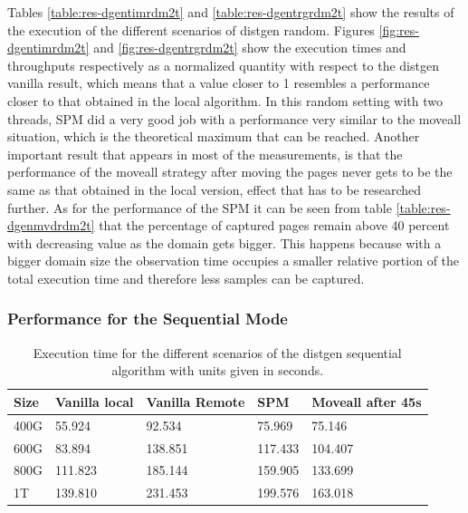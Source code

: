 Tables \ref{table:res-dgentimrdm2t} and \ref{table:res-dgentrgrdm2t} show the results of the execution of the different scenarios of distgen random. Figures \ref{fig:res-dgentimrdm2t} and \ref{fig:res-dgentrgrdm2t} show the execution times and throughputs respectively as a normalized quantity with respect to the distgen vanilla result, which means that a value closer to 1 resembles a performance closer to that obtained in the local algorithm. In this random setting with two threads, SPM did a very good job with a performance very similar to the moveall situation, which is the theoretical maximum that can be reached. Another important result that appears in most of the measurements, is that the performance of the moveall strategy after moving the pages never gets to be the same as that obtained in the local version, effect that has to be researched further.
As for the performance of the SPM it can be seen from table \ref{table:res-dgenmvdrdm2t} that the percentage of captured pages remain above 40 percent with decreasing value as the domain gets bigger. This happens because with a bigger domain size the observation time occupies a smaller relative portion of the total execution time and therefore less samples can be captured.

\FloatBarrier
\subsubsection{Performance for the Sequential Mode}\label{subsection:res-dgseq-2t}

\begin{table}[th]
	\centering
		\begin{tabularx}{\textwidth}{|l|l|l|l|X|}
		\hline
			Size & Vanilla local & Vanilla Remote & SPM & Moveall after 45s  \\
			\hline
			400G & 55.924 & 92.534  & 75.969 & 75.146\\
			\hline
			600G & 83.894 & 138.851 & 117.433 & 104.407 \\
			\hline
			800G & 111.823 & 185.144 & 159.905 & 133.699 \\
			\hline
			1T & 139.810 & 231.453 & 199.576 & 163.018 \\
			\hline
		\end{tabularx}
		\caption{Execution time for the different scenarios of the distgen sequential algorithm with units given in seconds.}
		\label{table:res-tbl-dgentimseq2t}
\end{table}


